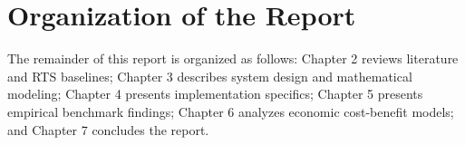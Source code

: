 \section{Organization of the Report}
The remainder of this report is organized as follows: Chapter 2 reviews literature and RTS baselines; Chapter 3 describes system design and mathematical modeling; Chapter 4 presents implementation specifics; Chapter 5 presents empirical benchmark findings; Chapter 6 analyzes economic cost-benefit models; and Chapter 7 concludes the report.

